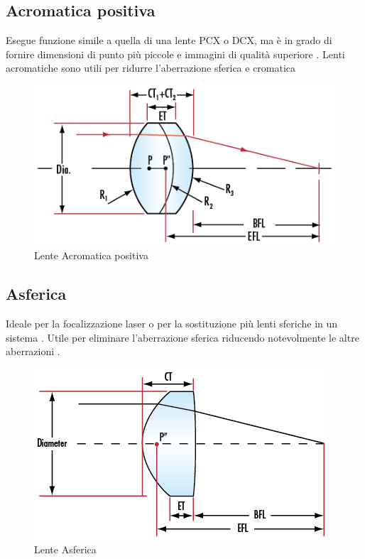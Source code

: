 \subsection{Acromatica positiva}
Esegue funzione simile a quella di una lente PCX o DCX, ma è in grado di fornire dimensioni di punto più piccole e immagini di qualità superiore . Lenti acromatiche sono utili per ridurre l'aberrazione sferica e cromatica
\begin{figure}[!ht]
\centering

\includegraphics[width=.3\textwidth]{img/positiva-acromatica.png}

\caption{Lente Acromatica positiva}
\label{fig:ccd-blockdiagram}
\end{figure}

\subsection{Asferica}
Ideale per la focalizzazione laser o per la sostituzione più lenti sferiche in un sistema . Utile per eliminare l'aberrazione sferica  riducendo notevolmente le altre aberrazioni .

\begin{figure}[!ht]
\centering

\includegraphics[width=.3\textwidth]{img/asferica.png}

\caption{Lente Asferica}
\label{fig:ccd-blockdiagram}
\end{figure}



